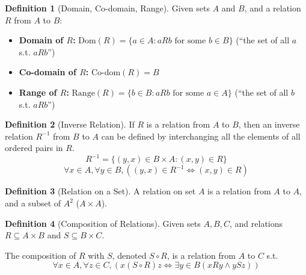 \documentclass{article}
\theoremstyle{plain}
\theoremstyle{definition}
\newtheorem*{definition}{Definition}
\theoremstyle{remark}
\begin{document}
\begin{definition}[Domain, Co-domain, Range]
    Given sets $A$ and $B$, and a relation $R$ from $A$ to $B$:
    \begin{itemize}
        \item \textbf{Domain of $R$:} $\text{Dom}(R) = \{a \in A : aRb \text{ for some } b \in B\}$ (``the set of all $a$ s.t. $aRb$'')
        \item \textbf{Co-domain of $R$:} $\text{Co-dom}(R) = B$
        \item \textbf{Range of $R$:} $\text{Range}(R) = \{b \in B : aRb \text{ for some } a \in A\}$ (``the set of all $b$ s.t. $aRb$'')
    \end{itemize}
\end{definition}

\begin{definition}[Inverse Relation]
    If $R$ is a relation from $A$ to $B$, then an inverse relation $R^{-1}$ from $B$ to $A$ can be defined by interchanging all the elements of all ordered pairs in $R$.
    \[ R^{-1} = \{(y,x) \in B \times A : (x,y) \in R\} \]
    \[ \forall x \in A, \forall y \in B, ((y,x) \in R^{-1} \Leftrightarrow (x,y) \in R) \]
\end{definition}

\begin{definition}[Relation on a Set]
    A relation on set $A$ is a relation from $A$ to $A$, and a subset of $A^2$ ($A \times A$).
\end{definition}

\begin{definition}[Composition of Relations]
    Given sets $A, B, C$, and relations $R \subseteq A \times B$ and $S \subseteq B \times C$.
    
    The composition of $R$ with $S$, denoted $S \circ R$, is a relation from $A$ to $C$ s.t.
    \[ \forall x \in A, \forall z \in C, (x (S \circ R) z \Leftrightarrow \exists y \in B (xRy \wedge ySz)) \]
\end{definition}
\end{document}
